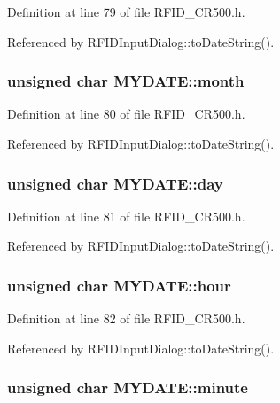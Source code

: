 Definition at line 79 of file RFID\_\-CR500.h.

Referenced by RFIDInputDialog::toDateString().\hypertarget{struct_m_y_d_a_t_e_406d9a0047246b45782cb239747cf769}{
\subsubsection[month]{\setlength{\rightskip}{0pt plus 5cm}unsigned char {\bf MYDATE::month}}}
\label{struct_m_y_d_a_t_e_406d9a0047246b45782cb239747cf769}




Definition at line 80 of file RFID\_\-CR500.h.

Referenced by RFIDInputDialog::toDateString().\hypertarget{struct_m_y_d_a_t_e_91fee9ad577107c8efba01c1322b2b54}{
\subsubsection[day]{\setlength{\rightskip}{0pt plus 5cm}unsigned char {\bf MYDATE::day}}}
\label{struct_m_y_d_a_t_e_91fee9ad577107c8efba01c1322b2b54}




Definition at line 81 of file RFID\_\-CR500.h.

Referenced by RFIDInputDialog::toDateString().\hypertarget{struct_m_y_d_a_t_e_426549a0228935f65a4bcbc918e69031}{
\subsubsection[hour]{\setlength{\rightskip}{0pt plus 5cm}unsigned char {\bf MYDATE::hour}}}
\label{struct_m_y_d_a_t_e_426549a0228935f65a4bcbc918e69031}




Definition at line 82 of file RFID\_\-CR500.h.

Referenced by RFIDInputDialog::toDateString().\hypertarget{struct_m_y_d_a_t_e_8224e4f5dd777baae8acf02944365d54}{
\subsubsection[minute]{\setlength{\rightskip}{0pt plus 5cm}unsigned char {\bf MYDATE::minute}}}
\label{struct_m_y_d_a_t_e_8224e4f5dd777baae8acf02944365d54}





